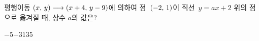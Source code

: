 평행이동 $(x,\mkern3mu y)\longrightarrow(x+4,\mkern3mu y-9)$에 의하여 점~$(-2,\mkern3mu 1)$이 직선~$y=ax+2$ 위의 점으로 옮겨질 때, 상수 $a$의 값은?
\begin{choices32}{$-5$}{$-3$}{$1$}{$3$}{$5$}\end{choices32}
